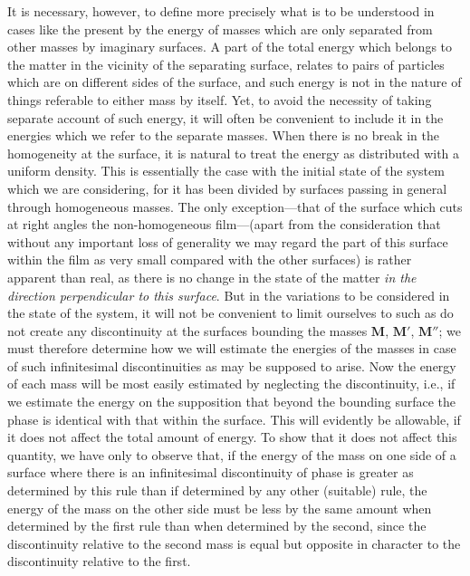 \documentclass[12pt]{article}
\begin{document}
{It is necessary, however, to define more precisely what is to be understood in cases like the present by the energy of masses which are only separated from other masses by imaginary surfaces. A part of the total energy which belongs to the matter in the vicinity of the separating surface, relates to pairs of particles which are on different sides of the surface, and such energy is not in the nature of things referable to either mass by itself. Yet, to avoid the necessity of taking separate account of such energy, it will often be convenient to include it in the energies which we refer to the separate masses. When there is no break in the homogeneity at the surface, it is natural to treat the energy as distributed with a uniform density. This is essentially the case with the initial state of the system which we are considering, for it has been divided by surfaces passing in general through homogeneous masses. The only exception---that of the surface which cuts at right angles the non-homogeneous film---(apart from the consideration that without any important loss of generality we may regard the part of this surface within the film as very small compared with the other surfaces) is rather apparent than real, as there is no change in the state of the matter \textit{in the direction perpendicular to this surface}. But in the variations to be considered in the state of the system, it will not be convenient to limit ourselves to such as do not create any discontinuity at the surfaces bounding the masses $\mathbf{M}$, $\mathbf{M}'$, $\mathbf{M}''$; we must therefore determine how we will estimate the energies of the masses in case of such infinitesimal discontinuities as may be supposed to arise. Now the energy of each mass will be most easily estimated by neglecting the discontinuity, i.e., if we estimate the energy on the supposition that beyond the bounding surface the phase is identical with that within the surface. This will evidently be allowable, if it does not affect the total amount of energy. To show that it does not affect this quantity, we have only to observe that, if the energy of the mass on one side of a surface where there is an infinitesimal discontinuity of phase is greater as determined by this rule than if determined by any other (suitable) rule, the energy of the mass on the other side must be less by the same amount when determined by the first rule than when determined by the second, since the discontinuity relative to the second mass is equal but opposite in character to the discontinuity relative to the first.

}
\end{document}
